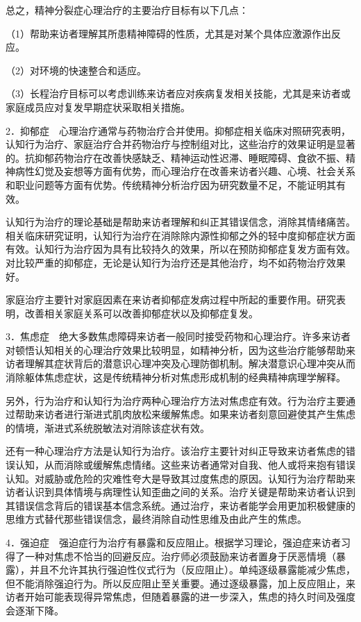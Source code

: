 总之，精神分裂症心理治疗的主要治疗目标有以下几点：

（1）帮助来访者理解其所患精神障碍的性质，尤其是对某个具体应激源作出反应。

（2）对环境的快速整合和适应。

（3）长程治疗目标可以考虑训练来访者应对疾病复发相关技能，尤其是来访者或家庭成员应对复发早期症状采取相关措施。

2．抑郁症　心理治疗通常与药物治疗合并使用。抑郁症相关临床对照研究表明，认知行为治疗、家庭治疗合并药物治疗与控制组对比，这些治疗的效果证明是显著的。抗抑郁药物治疗在改善快感缺乏、精神运动性迟滞、睡眠障碍、食欲不振、精神病性幻觉及妄想等方面有优势，而心理治疗在改善来访者兴趣、心境、社会关系和职业问题等方面有优势。传统精神分析治疗因为研究数量不足，不能证明其有效。

认知行为治疗的理论基础是帮助来访者理解和纠正其错误信念，消除其情绪痛苦。相关临床研究证明，认知行为治疗在消除除内源性抑郁之外的轻中度抑郁症状方面有效。认知行为治疗因为具有比较持久的效果，所以在预防抑郁症复发方面有效。对比较严重的抑郁症，无论是认知行为治疗还是其他治疗，均不如药物治疗效果好。

家庭治疗主要针对家庭因素在来访者抑郁症发病过程中所起的重要作用。研究表明，改善相关家庭关系可以改善抑郁症状以及抑郁症复发。

3．焦虑症　绝大多数焦虑障碍来访者一般同时接受药物和心理治疗。许多来访者对顿悟认知相关的心理治疗效果比较明显，如精神分析，因为这些治疗能够帮助来访者理解其症状背后的潜意识心理冲突及心理防御机制。解决潜意识心理冲突从而消除躯体焦虑症状，这是传统精神分析对焦虑形成机制的经典精神病理学解释。

另外，行为治疗和认知行为治疗两种心理治疗方法对焦虑症有效。行为治疗主要通过帮助来访者进行渐进式肌肉放松来缓解焦虑。如果来访者刻意回避使其产生焦虑的情境，渐进式系统脱敏法对消除该症状有效。

还有一种心理治疗方法是认知行为治疗。该治疗主要针对纠正导致来访者焦虑的错误认知，从而消除或缓解焦虑情绪。这些来访者通常对自我、他人或将来抱有错误认知。对威胁或危险的灾难性夸大是导致其过度焦虑的原因。认知行为治疗帮助来访者认识到具体情境与病理性认知歪曲之间的关系。治疗关键是帮助来访者认识到其错误信念背后的错误基本信念系统。通过治疗，来访者能学会用更加积极健康的思维方式替代那些错误信念，最终消除自动性思维及由此产生的焦虑。

4．强迫症　强迫症行为治疗有暴露和反应阻止。根据学习理论，强迫症来访者习得了一种对焦虑不恰当的回避反应。治疗师必须鼓励来访者置身于厌恶情境（暴露），并且不允许其执行强迫性仪式行为（反应阻止）。单纯逐级暴露能减少焦虑，但不能消除强迫行为。所以反应阻止至关重要。通过逐级暴露，加上反应阻止，来访者开始可能表现得异常焦虑，但随着暴露的进一步深入，焦虑的持久时间及强度会逐渐下降。

